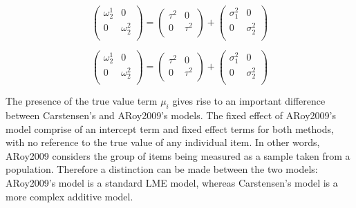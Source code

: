\documentclass[12pt, a4paper]{report}
\theoremstyle{plain}
\theoremstyle{definition}
\theoremstyle{remark}
\begin{document}
	\[\left(\begin{array}{cc}
	\omega^1_2  & 0 \\
	0 & \omega^2_2 \\
	\end{array}  \right)
	=  \left(
	\begin{array}{cc}
	\tau^2  & 0 \\
	0 & \tau^2 \\
	\end{array} \right)+
	\left(
	\begin{array}{cc}
	\sigma^2_1  & 0 \\
	0 & \sigma^2_2 \\
	\end{array}\right)
	\]
	
	
	\[\left(\begin{array}{cc}
	\omega^1_2  & 0 \\
	0 & \omega^2_2 \\
	\end{array}  \right)
	=  \left(
	\begin{array}{cc}
	\tau^2  & 0 \\
	0 & \tau^2 \\
	\end{array} \right)+
	\left(
	\begin{array}{cc}
	\sigma^2_1  & 0 \\
	0 & \sigma^2_2 \\
	\end{array}\right)
	\]
	
	The presence of the true value term $\mu_i$ gives rise to an important difference between Carstensen's and ARoy2009's models. The fixed effect of ARoy2009's model comprise of an intercept term and fixed effect terms for both methods, with no reference to the true value of any individual item. In other words, ARoy2009 considers the group of items being measured as a sample taken from a population. Therefore a distinction can be made between the two models: ARoy2009's model is a standard LME model, whereas Carstensen's model is a more complex additive model.
	
	
\end{document}
